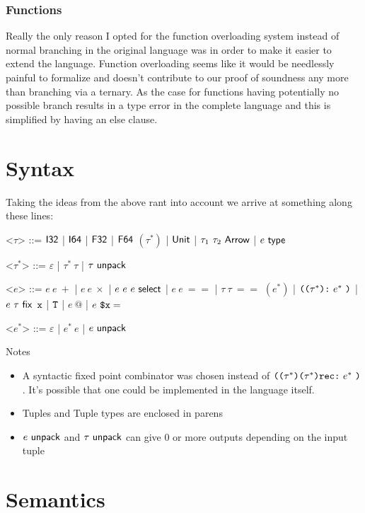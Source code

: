 \documentclass{article}
\begin{document}
\subsubsection{Functions}
Really the only reason I opted for the function overloading system instead of normal branching in the original language was in order to make it easier to extend the language.
Function overloading seems like it would be needlessly painful to formalize and doesn't contribute to our proof of soundness any more than branching via a ternary. As the case for functions having potentially no possible branch results in a type error in the complete language and this is simplified by having an else clause.

\section{Syntax}
Taking the ideas from the above rant into account we arrive at something along these lines:

\renewcommand{\grammarlabel}[2]{#1 \hfill#2}
\begin{grammar}
    <$\tau$> ::= $\mathsf{I32}$
    |    $\mathsf{I64}$
    |    $\mathsf{F32}$
    |    $\mathsf{F64}$
    \alt $(\tau^*)$
    |    $\mathsf{Unit}$
    |    $\tau_1 ~ \tau_2 ~ \mathsf{Arrow}$
    |    $e ~ \mathsf{type}$
        
    <$\tau^*$> ::= $\varepsilon$ | $\tau^* ~ \tau$ | $\tau ~ \mathsf{unpack}$

    <$e$> ::= $e~ e~ +$
    |    $e~ e~ \times$
    |    $e ~ e ~ e ~ \mathsf{select} $
    |    $e~ e~ ==$
    |    $\tau~ \tau~ ==$
    \alt $(e^*)$
    |    $\texttt{((} \tau^* \texttt{):} ~ e^* ~ \texttt{)}$
    |    $e ~ \tau ~ \mathsf{fix}$
    \alt $\texttt{x}$
    |    $\texttt{T}$
    |    $e~ \textbf{@} $
    |    $e~ \texttt{\$x} =$

    <$e^*$> ::= $\varepsilon$ | $e^* ~ e$ | $e ~ \mathsf{unpack}$
\end{grammar}
Notes
\begin{itemize}
    \item A syntactic fixed point combinator was chosen instead of $\texttt{((} \tau^* \texttt{)(} \tau^* \texttt{)rec:} ~ e^* ~ \texttt{)}$. It's possible that one could be implemented in the language itself.
    \item Tuples and Tuple types are enclosed in parens
    \item $e ~ \mathsf{unpack}$ and $\tau ~ \mathsf{unpack}$ can give 0 or more outputs depending on the input tuple
\end{itemize}

\section{Semantics}
\end{document}
